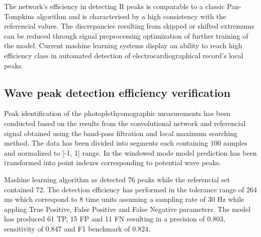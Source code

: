 \documentclass[journal]{IEEEtran}
\begin{document}
{\newpage
The network's efficiency in detecting R peaks is comparable to a classic Pan-Tompkins algorithm and is characterised by a high consistency with the referencial values. The discrepancies resulting from skipped or shifted extremums can be reduced through signal preprocessing optimization of further training of the model. Current mashine learning systems display an ability to reach high efficiency class in automated detection of electrocardiographical record's local peaks.

\subsection{Wave peak detection efficiency verification}
Peak identification of the photoplethysmographic measurements has been conducted based on the results from the convolutional network and referencial signal obtained using the band-pass filtration and local maximum searching method. The data has been divided into segments each containing 100 samples and normalized to [-1, 1] range. In the windowed mode model prediction has been transformed into point indexes corresponding to potential wave peaks.

Mashine learning algorithm as detected 76 peaks while the referencial set contained 72. The detection efficiency has performed in the tolerance range of 264 ms which correspond to 8 time units assuming a sampling rate of 30 Hz while appling True Positive, False Positive and False Negative parameters. The model has produced 61 TP, 15 FP and 11 FN resulting in a precision of 0.803, sensitivity of 0.847 and F1 benchmark of 0.824.

}
\end{document}

